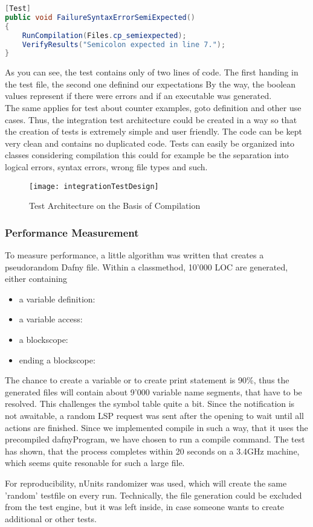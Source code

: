 \begin{lstlisting}[language=csharp, caption={Sample Test for Missing Semicolon}, captionpos=b, label={lst:demoTest}]
[Test]
public void FailureSyntaxErrorSemiExpected()
{
    RunCompilation(Files.cp_semiexpected);
    VerifyResults("Semicolon expected in line 7.");
}
\end{lstlisting}


As you can see, the test contains only of two lines of code.
The first handing in the test file, the second one definind our expectations
 By the way, the boolean values represent if there were errors and if an executable was generated.\\
The same applies for test about counter examples, goto definition and other use cases.
Thus, the integration test architecture could be created in a way so that the creation of tests is extremely simple and user friendly.
The code can be kept very clean and contains no duplicated code.
Tests can easily be organized into classes \textendash{} considering compilation this could for example be the separation into logical errors, syntax errors, wrong file types and such.

\begin{figure}[H]
    \centering
    \texttt{[image: integrationTestDesign]}
    \caption{Test Architecture on the Basis of Compilation}
    \label{fig:testArchitecture}
\end{figure}

\subsubsection{Performance Measurement }
To measure performance, a little algorithm was written that creates a pseudorandom Dafny file.
Within a classmethod, 10'000 LOC are generated, either containing
\begin{itemize}
    \item a variable definition: 
    \item a variable access: 
    \item a blockscope: 
    \item ending a blockscope: \code{\}}
\end{itemize}
The chance to create a variable or to create print statement is 90\%, thus the generated files will contain about 9'000 variable name segments, that have to be resolved.
This challenges the symbol table quite a bit.
Since the  notification is not awaitable, a random LSP request was sent after the opening to wait until all actions are finished.
Since we implemented compile in such a way, that it uses the precompiled dafnyProgram, we have chosen to run a compile command.
The test has shown, that the process completes within 20 seconds on a 3.4GHz machine, which seems quite resonable for such a large file.

For reproducibility, nUnits randomizer was used, which will create the same 'random' testfile on every run.
Technically, the file generation could be excluded from the test engine, but it was left inside, in case someone wants to create additional or other tests.